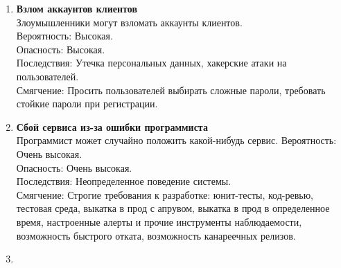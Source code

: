 \begin{enumerate}
      \item \textbf{Взлом аккаунтов клиентов} \\
            Злоумышленники могут взломать аккаунты клиентов. \\
            Вероятность: Высокая. \\
            Опасность: Высокая. \\
            Последствия: Утечка персональных данных, хакерские атаки на пользователей. \\
            Смягчение: Просить пользователей выбирать сложные пароли, требовать 
            стойкие пароли при регистрации.

      \item \textbf{Сбой сервиса из-за ошибки программиста} \\
            Программист может случайно положить какой-нибудь сервис.
            Вероятность: Очень высокая. \\
            Опасность: Очень высокая. \\
            Последствия: Неопределенное поведение системы. \\
            Смягчение: Строгие требования к разработке: 
            юнит-тесты, код-ревью, тестовая среда, выкатка в прод с апрувом,
            выкатка в прод в определенное время, настроенные алерты и прочие 
            инструменты наблюдаемости, возможность быстрого отката,
            возможность канареечных релизов.

      \item \textbf{} \\

\end{enumerate}